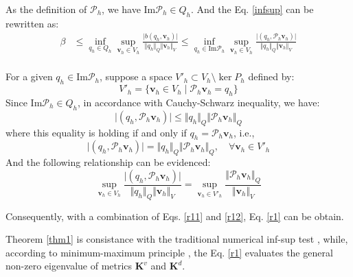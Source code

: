 \begin{pf}
As the definition of  $\mathcal P_h$, we have $\mathrm{Im}\mathcal P_h \in Q_h$. And the Eq. \eqref{infsup} can be rewritten as:
\begin{equation} \label{r11}
\begin{split}
    \beta &\le \inf_{q_h \in Q_h} \sup_{\boldsymbol v_h \in V_h} \frac{\vert b(q_h,\boldsymbol v_h) \vert}{\Vert q_h \Vert_Q \Vert \boldsymbol v_h \Vert_V} 
    \le \inf_{q_h \in \mathrm{Im}\mathcal P_h} \sup_{\boldsymbol v_h \in V_h} \frac{\vert (q_h,\mathcal P_h \boldsymbol v_h) \vert}{\Vert q_h \Vert_Q \Vert \boldsymbol v_h \Vert_V} \\
\end{split}
\end{equation}

For a given $q_h\in \mathrm{Im}\mathcal P_h$, suppose a space $V'_h \subset V_h\setminus \ker P_h$ defined by:
\begin{equation}
    V'_h = \{ \boldsymbol v_h \in V_h \; \vert \; \mathcal P_h \boldsymbol v_h = q_h \}
\end{equation}
Since $\mathrm{Im}\mathcal P_h \in Q_h$, in accordance with Cauchy-Schwarz inequality, we have:
\begin{equation}
    \vert (q_h,\mathcal P_h \boldsymbol v_h) \vert \le \Vert q_h \Vert_Q \Vert \mathcal P_h \boldsymbol v_h \Vert_Q
\end{equation}
where this equality is holding if and only if $q_h=\mathcal P_h \boldsymbol v_h$, i.e.,
\begin{equation}
    \vert (q_h,\mathcal P_h \boldsymbol v_h) \vert = \Vert q_h \Vert_Q \Vert \mathcal P_h \boldsymbol v_h \Vert_Q, \quad \forall \boldsymbol v_h \in V'_h
\end{equation}
And the following relationship can be evidenced:
    \begin{equation}\label{r12}
    \sup_{\boldsymbol v_h\in V_h} \frac{\vert (q_h,\mathcal P_h \boldsymbol v_h) \vert}{\Vert q_h \Vert_Q \Vert \boldsymbol v_h \Vert_V} =
    \sup_{\boldsymbol v_h\in V'_h} \frac{\Vert \mathcal P_h \boldsymbol v_h \Vert_Q}{\Vert \boldsymbol v_h \Vert_V} 
\end{equation}

Consequently, with a combination of Eqs. \eqref{r11} and \eqref{r12}, Eq. \eqref{r1} can be obtain.
\end{pf}

\begin{rmk}
Theorem \ref{thm1} is consistance with the traditional numerical inf-sup test \cite{malkus1981}, while, according to minimum-maximum principle \cite{babuska1991a}, the Eq. \eqref{r1} evaluates the general non-zero eigenvalue of metrics $\boldsymbol K^v$ and $\boldsymbol K^d$.
\end{rmk}

